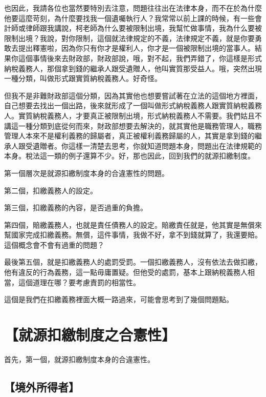\documentclass[]{ctexbook}
\begin{document}
也因此，我請各位也當然要特別去注意，問題往往出在法律本身，而不在於為什麼他要這麼苛刻，為什麼要找我一個遺囑執行人？我常常以前上課的時候，有一些會計師或律師跟我講說，柯老師為什么要被限制出境，我幫忙做事情，我為什么要被限制出境？我說，對你限制，這個就法律規定的不義，法律規定不義，就是你要勇敢去提出釋憲啦，因為你只有你才是權利人，你才是一個被限制出境的當事人。結果你這個事情後來去財政部，財政部說，哦，對不起，我們弄錯了，你這樣是形式納稅義務人，那個拿到錢的繼承人跟受遺贈人，他叫實質那受益人。哦，突然出現一種分類，叫做形式跟實質納稅義務人。好奇怪。

但我不是非難財政部這個分類，因為其實他也想要嘗試著在立法的這個地方裡面，自己想要去找出一個出路，後來就形成了一個叫做形式納稅義務人跟實質納稅義務人。實質納稅義務人，才要真正被限制出境，形式納稅義務人不需要。我們姑且不講這一種分類到底從何而來，財政部想要去解決的，就其實他是職務管理人，職務管理人本來不是權利義務的歸屬者，真正被權利義務歸屬的人，其實是拿到錢的繼承人跟受遺贈者。你這樣一清楚去思考，你就知道問題本身，問題出在法律規範的本身。稅法這一類的例子還算不少。好，那也因此，回到我們的就源扣繳制度。

第一個層次是就源扣繳制度本身的合違憲性的問題。

第二個，扣繳義務人的設定。

第三個，扣繳義務的內容，是否過重的負擔。

第四個，賠繳義務人，也就是責任債務人的設定。賠繳責任就是，他其實是無償來幫國家完成扣繳義務。無償，這件事情，我做不好，拿不到錢就算了，我還要賠。這個概念會不會有過重的問題？

最後第五個，就是扣繳義務人的處罰受罰。一個扣繳義務人，沒有依法去做扣繳，他有違反的行為義務，這一點毋庸置疑。但他受的處罰，基本上跟納稅義務人相當，這個道理在哪？要考慮責罰的相當性。

這個是我們在扣繳義務裡面大概一路過來，可能會思考到了幾個問題點。

\hypertarget{ux5c31ux6e90ux6263ux7e73ux5236ux5ea6ux4e4bux5408ux61b2ux6027}{%
\section{【就源扣繳制度之合憲性】}\label{ux5c31ux6e90ux6263ux7e73ux5236ux5ea6ux4e4bux5408ux61b2ux6027}}

首先，第一個，就源扣繳制度本身的合違憲性。

\hypertarget{ux5883ux5916ux6240ux5f97ux8005}{%
\subsection{【境外所得者】}\label{ux5883ux5916ux6240ux5f97ux8005}}
\end{document}
